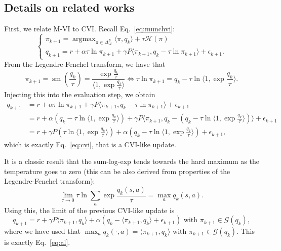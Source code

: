 \documentclass{article}
\newcommand{\gr}{\mathcal{G}}
\DeclareMathOperator*{\argmax}{argmax}
\DeclareMathOperator*{\softmax}{sm}
\newcommand{\states}{\mathcal{S}}
\newcommand{\actions}{\mathcal{A}}
\begin{document}
\subsection{Details on related works}
\label{subappx:related_works}

First, we relate M-VI to CVI. Recall Eq.~\eqref{eq:munchvi}:
\begin{equation}
\begin{cases}
    \pi_{k+1} = \argmax_{\pi\in\Delta_\actions^\states}\langle\pi, q_k\rangle + \tau\mathcal{H}(\pi)
    \\
    q_{k+1} = r + \alpha\tau\ln\pi_{k+1} + \gamma P\langle\pi_{k+1}, q_k - \tau \ln \pi_{k+1}\rangle  +  \epsilon_{k+1}.
\end{cases}
\end{equation}
From the Legendre-Fenchel transform, we have that
\begin{equation}
    \pi_{k+1} = \softmax(\frac{q_k}{\tau}) =  \frac{\exp\frac{q_k}{\tau}}{\langle 1,\exp\frac{q_k}{\tau}\rangle} \Leftrightarrow \tau \ln \pi_{k+1} = q_k - \tau \ln \langle 1, \exp\frac{q_k}{\tau}\rangle.
\end{equation}
Injecting this into the evaluation step, we obtain
\begin{align}
    q_{k+1} &= r + \alpha\tau\ln\pi_{k+1} + \gamma P\langle\pi_{k+1}, q_k - \tau \ln \pi_{k+1}\rangle  +  \epsilon_{k+1}
    \\
    &= r + \alpha(q_k - \tau \ln \langle 1, \exp\frac{q_k}{\tau}\rangle) + \gamma P\langle\pi_{k+1}, q_k - (q_k - \tau \ln \langle 1, \exp\frac{q_k}{\tau}\rangle)\rangle  +  \epsilon_{k+1}
    \\
    &= r + \gamma P(\tau \ln\langle 1, \exp\frac{q_k}{\tau}\rangle) + \alpha(q_k - \tau \ln\langle 1, \exp\frac{q_k}{\tau}\rangle) + \epsilon_{k+1},
\end{align}
which is exactly Eq.~\eqref{eq:cvi}, that is a CVI-like update.

It is a classic result that the sum-log-exp tends towards the hard maximum as the temperature goes to zero (this can be also derived from properties of the Legendre-Fenchel transform):
\begin{equation}
    \lim_{\tau\rightarrow 0} \tau \ln \sum_{a} \exp\frac{q_k(s,a)}{\tau} = \max_{a} q_k(s,a).
\end{equation}
Using this, the limit of the previous CVI-like update is
\begin{equation}
    q_{k+1} = r + \gamma P\langle \pi_{k+1},q_k\rangle + \alpha (q_k - \langle \pi_{k+1}, q_k\rangle + \epsilon_{k+1}) \text{ with } \pi_{k+1} \in\gr(q_k),
\end{equation}
where we have used that $\max_a q_k(\cdot, a) = \langle \pi_{k+1}, q_k\rangle$ with $\pi_{k+1}\in\gr(q_k)$. This is exactly Eq.~\eqref{eq:al}.
\end{document}
